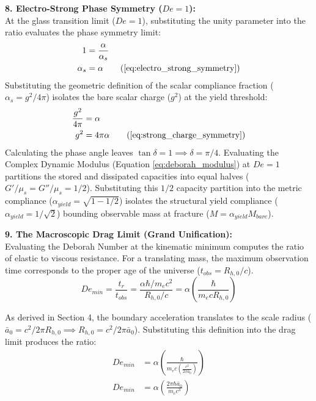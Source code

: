 \vspace{0.2 cm}

\textbf{8. Electro-Strong Phase Symmetry ($De = 1$):} \\ 
At the glass transition limit ($De = 1$), substituting the unity parameter into the ratio evaluates the phase symmetry limit: 
\begin{align}
    1 &= \frac{\alpha}{\alpha_s} \\
    \alpha_s &= \alpha \tag{\ref{eq:electro_strong_symmetry}}
\end{align}
Substituting the geometric definition of the scalar compliance fraction ($\alpha_s = g^2 / 4\pi$) isolates the bare scalar charge ($g^2$) at the yield threshold: 
\begin{align}
    \frac{g^2}{4\pi} &= \alpha \\
    g^2 &= 4\pi\alpha \tag{\ref{eq:strong_charge_symmetry}}
\end{align}
Calculating the phase angle leaves $\tan \delta = 1 \implies \delta = \pi/4$. Evaluating the Complex Dynamic Modulus (Equation \ref{eq:deborah_modulus}) at $De = 1$ partitions the stored and dissipated capacities into equal halves ($G'/\mu_s = G''/\mu_s = 1/2$). Substituting this $1/2$ capacity partition into the metric compliance ($\alpha_{yield} = \sqrt{1 - 1/2}$) isolates the structural yield compliance ($\alpha_{yield} = 1/\sqrt{2}$) bounding observable mass at fracture ($M = \alpha_{yield} M_{bare}$). %

\vspace{0.2 cm}

\textbf{9. The Macroscopic Drag Limit (Grand Unification):} \\ 
Evaluating the Deborah Number at the kinematic minimum computes the ratio of elastic to viscous resistance. For a translating mass, the maximum observation time corresponds to the proper age of the universe ($t_{obs} = R_{h,0} / c$).
\begin{equation}
    De_{min} = \frac{t_r}{t_{obs}} = \frac{\alpha \hbar / m_e c^2}{R_{h,0} / c} = \alpha \left( \frac{\hbar}{m_e c R_{h,0}} \right)
\end{equation}

As derived in Section 4, the boundary acceleration translates to the scale radius ($\bar{a}_0 = c^2 / 2\pi R_{h,0} \implies R_{h,0} = c^2 / 2\pi \bar{a}_0$). Substituting this definition into the drag limit produces the ratio:
\begin{align}
    De_{min} &= \alpha \left( \frac{\hbar}{m_e c \left( \frac{c^2}{2\pi \bar{a}_0} \right)} \right) \\
    De_{min} &= \alpha \left( \frac{2\pi \hbar \bar{a}_0}{m_e c^3} \right) \label{eq:alpha_a0_bridge}
\end{align}

